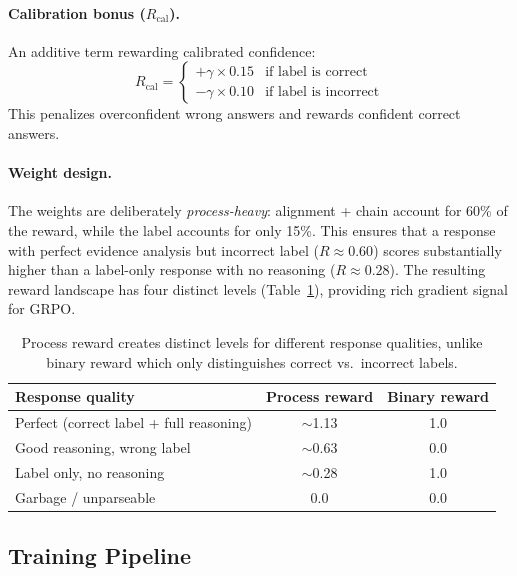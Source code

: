 \documentclass{article}
\begin{document}
\paragraph{Calibration bonus ($R_{\text{cal}}$).}
An additive term rewarding calibrated confidence:
\begin{equation}
R_{\text{cal}} = \begin{cases}
+\gamma \times 0.15 & \text{if label is correct} \\
-\gamma \times 0.10 & \text{if label is incorrect}
\end{cases}
\end{equation}
This penalizes overconfident wrong answers and rewards confident correct answers.

\paragraph{Weight design.}
The weights are deliberately \emph{process-heavy}: alignment + chain account for 60\% of the reward, while the label accounts for only 15\%.
This ensures that a response with perfect evidence analysis but incorrect label ($R \approx 0.60$) scores substantially higher than a label-only response with no reasoning ($R \approx 0.28$).
The resulting reward landscape has four distinct levels (Table~\ref{tab:reward_levels}), providing rich gradient signal for GRPO.

\begin{table}[t]
\centering
\caption{Process reward creates distinct levels for different response qualities, unlike binary reward which only distinguishes correct vs.\ incorrect labels.}
\label{tab:reward_levels}
\small
\begin{tabular}{lcc}
\toprule
\textbf{Response quality} & \textbf{Process reward} & \textbf{Binary reward} \\
\midrule
Perfect (correct label + full reasoning) & $\sim$1.13 & 1.0 \\
Good reasoning, wrong label & $\sim$0.63 & 0.0 \\
Label only, no reasoning & $\sim$0.28 & 1.0 \\
Garbage / unparseable & 0.0 & 0.0 \\
\bottomrule
\end{tabular}
\end{table}


\subsection{Training Pipeline}
\label{sec:training}
\end{document}
